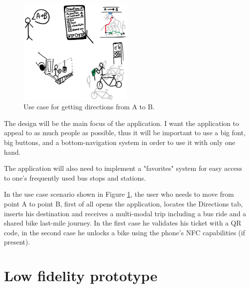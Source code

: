\documentclass[11pt]{article}
\begin{document}
\begin{figure}[h!]
    \centering
    \includegraphics[width=0.5\textwidth]{drawable/usecase/usecase2}
    \caption{Use case for getting directions from A to B.}
    \label{fig:usecase}
\end{figure}

The design will be the main focus of the application. I want the application to appeal to as much people as possible, thus it will be important to use a big font, big buttons, and a bottom-navigation system in order to use it with only one hand.

The application will also need to implement a "favorites" system for easy access to one's frequently used bus stops and stations.

In the use case scenario shown in Figure \ref{fig:usecase}, the user who needs to move from point A to point B, first of all opens the application, locates the Directions tab, inserts his destination and receives a multi-modal trip including a bus ride and a shared bike last-mile journey. In the first case he validates his ticket with a QR code, in the second case he unlocks a bike using the phone's NFC capabilities (if present).

\section{Low fidelity prototype}
\end{document}
